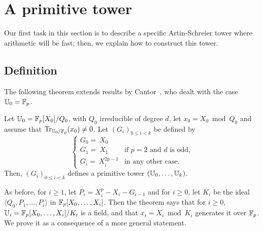 

\section{A primitive tower}
\label{sec:fast-tower}

Our first task in this section is to describe a specific
Artin-Schreier tower where arithmetic will be fast; then, we explain
how to construct this tower. 


\subsection{Definition}

The following theorem extends results by
Cantor~\cite[Theorem~1.2]{cantor89}, who dealt with the case
$\mathbb{U}_0=\mathbb{F}_p$.

\begin{theorem}
  \label{th:cantor}
  Let $\mathbb{U}_0=\mathbb{F}_p[X_0]/Q_0$, with $Q_0$ irreducible of degree $d$, let
  $x_0 = X_0 \bmod Q_0$ and assume that
  $\operatorname{Tr}_{\mathbb{U}_0/\mathbb{F}_p}(x_0)\ne0$. Let $(G_i)_{0 \le i <k}$ be defined by
$$ \begin{cases}
G_0 = ~X_0\\
G_1 = ~X_1        &\text{if $p=2$ and $d$ is odd,}\\
G_i = ~X_i^{2p-1} &\text{in any other case.}
\end{cases}$$
Then, $(G_i)_{0 \le i <k}$ defines a primitive tower $(\mathbb{U}_0,\dots,\mathbb{U}_k)$.
\end{theorem}

As before, for $i \ge 1$, let $P_i = X_i^p - X_i - G_{i-1}$ and for $i
\ge 0$, let $K_i$ be the ideal $\langle Q_0,P_1,\dots,P_i\rangle$ in
$\mathbb{F}_p[X_0,\dots,X_i]$.  Then the theorem says that for $i\ge 0$,
$\mathbb{U}_i=\mathbb{F}_p[X_0,\dots,X_i]/K_i$ is a field, and that $x_i=X_i \bmod
K_i$ generates it over $\mathbb{F}_p$.  We prove it as a consequence of a more
general statement.

